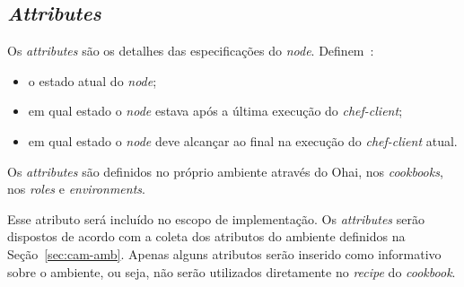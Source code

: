 \subsection{\textit{Attributes}}
\label{sec:lev-rec-att}

Os \textit{attributes} são os detalhes das especificações do \textit{node}. Definem~\cite{chefdoc:2016}:

\begin{itemize}
  \item o estado atual do \textit{node};
  \item em qual estado o \textit{node} estava após a última execução do \textit{chef-client};
  \item em qual estado o \textit{node} deve alcançar ao final na execução do \textit{chef-client} atual.
\end{itemize}

Os \textit{attributes} são definidos no próprio ambiente através do Ohai, nos \textit{cookbooks},
nos \textit{roles} e \textit{environments}.

Esse atributo será incluído no escopo de implementação. Os \textit{attributes} serão dispostos
de acordo com a coleta dos atributos do ambiente definidos na Seção~\ref{sec:cam-amb}.
Apenas alguns atributos serão inserido como informativo sobre o ambiente, ou seja,
não serão utilizados diretamente no \textit{recipe} do \textit{cookbook}.

